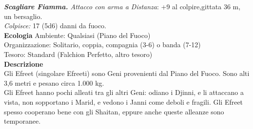 \begin{multicols}{2}
\emph{\textbf{Scagliare Fiamma.} Attacco con arma a Distanza}: +9 al colpire,gittata 36 m, un bersaglio.\\
\emph{Colpisce:} 17 (5d6) danni da fuoco.\\
\textbf{Ecologia}
Ambiente: Qualsiasi (Piano del Fuoco)\\
Organizzazione: Solitario, coppia, compagnia (3-6) o banda (7-12)\\
Tesoro: Standard (Falchion Perfetto, altro tesoro)\\
\textbf{Descrizione}\\
Gli Efreet (singolare Efreeti) sono Geni provenienti dal Piano del Fuoco. Sono alti 3,6 metri e pesano circa 1.000 kg.\\
Gli Efreet hanno pochi alleati tra gli altri Geni: odiano i Djinni, e li attaccano a vista, non sopportano i Marid, e vedono i Janni come deboli e fragili. Gli Efreet spesso cooperano bene con gli Shaitan, eppure anche queste alleanze sono temporanee.\\


\end{multicols}
